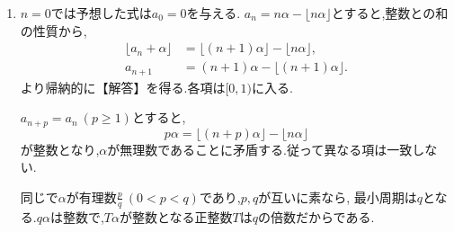 \noindent {}\par\nobreak
\begin{enumerate}[label=(\arabic*),parsep=3pt,beginpenalty=10000,format=\bookitemlink{example-gauss-role-9}{solution}{problem}]
  \item $n=0$では予想した式は$a_0=0$を与える.
    $a_n=n\alpha-\lfloor n\alpha\rfloor$とすると,整数との和の性質から,
    \begin{align*}
      \lfloor a_n+\alpha\rfloor
      &=\lfloor(n+1)\alpha\rfloor-\lfloor n\alpha\rfloor,\\
      a_{n+1}
      &=(n+1)\alpha-\lfloor(n+1)\alpha\rfloor.
    \end{align*}
    より帰納的に【解答】を得る.各項は$[0,1)$に入る.

    $a_{n+p}=a_n\ (p\ge1)$とすると,
    \[
      p\alpha=\lfloor(n+p)\alpha\rfloor-\lfloor n\alpha\rfloor
    \]
    が整数となり,$\alpha$が無理数であることに矛盾する.従って異なる項は一致しない.

    同じで$\alpha$が有理数$\frac pq\ (0<p<q)$であり,$p,q$が互いに素なら,
    最小周期は$q$となる.$q\alpha$は整数で,$T\alpha$が整数となる正整数$T$は$q$の倍数だからである.
\end{enumerate}
